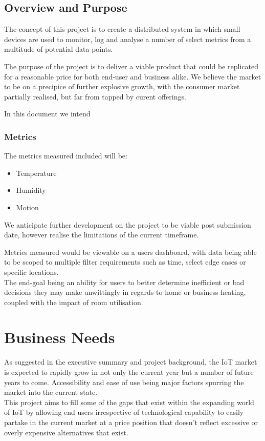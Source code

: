 \documentclass{article}
\begin{document}
        \subsection{Overview and Purpose}
            The concept of this project is to create a distributed system in which small 
            devices are used to monitor, log and analyse a number of select metrics from a 
            multitude of potential data points.
            \par\noindent
            The purpose of the project is to deliver a viable product that could be replicated
            for a reasonable price for both end-user and business alike. We believe the market to
            be on a precipice of further explosive growth, with the consumer market partially
            realised, but far from tapped by curent offerings.
            \par\noindent
            In this document we intend 
            \subsubsection{Metrics}
                The metrics measured included will be: 
                \begin{itemize}
                    \item Temperature
                    \item Humidity
                    \item Motion
                \end{itemize}
                We anticipate further development on the project to be viable post submission date,
                however realise the limitations of the current timeframe.
                \par
                Metrics measured would be viewable on a users dashboard, with data being able to be
                scoped to multiple filter requirements such as time, select edge cases or specific 
                locations.
                \\
                The end-goal being an ability for users to better determine inefficient or bad decisions
                they may make unwittingly in regards to home or business heating, coupled with the 
                impact of room utilisation.

    \newpage

    \section{Business Needs}
        As suggested in the executive summary and project background, the IoT market is expected 
        to rapidly grow in not only the current year but a number of future years to come. Accessibility and ease of use being major factors spurring the market into the current 
        state.
        \\
        This project aims to fill some of the gaps that exist within the expanding world of IoT
        by allowing end users irrespective of technological capability to easily partake in the 
        current market at a price position that doesn't reflect excessive or overly expensive 
        alternatives that exist.
\end{document}

